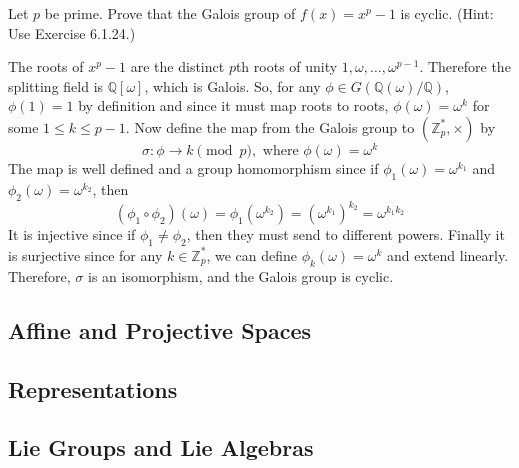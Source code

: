   \begin{exercise}[Shifrin 7.6.23]
    Let $p$ be prime. Prove that the Galois group of $f(x) = x^p - 1$ is cyclic. (Hint: Use Exercise 6.1.24.)
  \end{exercise}
  \begin{solution}
    The roots of $x^p - 1$ are the distinct $p$th roots of unity $1, \omega, \ldots, \omega^{p-1}$. Therefore the splitting field is $\mathbb{Q}[\omega]$, which is Galois. So, for any $\phi \in G(\mathbb{Q}(\omega)/\mathbb{Q})$, $\phi(1) = 1$ by definition and since it must map roots to roots, $\phi(\omega) = \omega^k$ for some $1 \leq k \leq p - 1$. Now define the map from the Galois group to $(\mathbb{Z}_p^\ast, \times)$ by 
    \begin{equation}
      \sigma:\phi \to k \pmod{p}, \text{ where } \phi(\omega) = \omega^k 
    \end{equation}
    The map is well defined and a group homomorphism since if $\phi_1 (\omega) = \omega^{k_1}$ and $\phi_2 (\omega) = \omega^{k_2}$, then 
    \begin{equation}
      (\phi_1 \circ \phi_2) (\omega) = \phi_1 (\omega^{k_2}) = (\omega^{k_1})^{k_2} = \omega^{k_1 k_2}
    \end{equation}
    It is injective since if $\phi_1 \neq \phi_2$, then they must send to different powers. Finally it is surjective since for any $k \in \mathbb{Z}_p^\ast$, we can define $\phi_k (\omega) = \omega^k$ and extend linearly. Therefore, $\sigma$ is an isomorphism, and the Galois group is cyclic.  
  \end{solution}

\subsection{Affine and Projective Spaces}

\subsection{Representations}

\subsection{Lie Groups and Lie Algebras}



